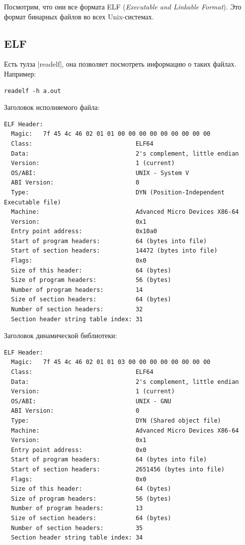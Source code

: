 \documentclass[11pt]{article}
\begin{document}
Посмотрим, что они все формата ELF (\textit{Executable and Linkable Format}).
Это формат бинарных файлов во всех Unix-системах.

\subsection{ELF}

Есть тулза \nolint|readelf|, она позволяет посмотреть информацию о таких
файлах. Например:

\begin{lstlisting}
readelf -h a.out
\end{lstlisting}
Заголовок исполняемого файла:

\begin{lstlisting}
ELF Header:
  Magic:   7f 45 4c 46 02 01 01 00 00 00 00 00 00 00 00 00
  Class:                             ELF64
  Data:                              2's complement, little endian
  Version:                           1 (current)
  OS/ABI:                            UNIX - System V
  ABI Version:                       0
  Type:                              DYN (Position-Independent Executable file)
  Machine:                           Advanced Micro Devices X86-64
  Version:                           0x1
  Entry point address:               0x10a0
  Start of program headers:          64 (bytes into file)
  Start of section headers:          14472 (bytes into file)
  Flags:                             0x0
  Size of this header:               64 (bytes)
  Size of program headers:           56 (bytes)
  Number of program headers:         14
  Size of section headers:           64 (bytes)
  Number of section headers:         32
  Section header string table index: 31
\end{lstlisting}
\newpage

Заголовок динамической библиотеки:

\begin{lstlisting}
ELF Header:
  Magic:   7f 45 4c 46 02 01 01 03 00 00 00 00 00 00 00 00
  Class:                             ELF64
  Data:                              2's complement, little endian
  Version:                           1 (current)
  OS/ABI:                            UNIX - GNU
  ABI Version:                       0
  Type:                              DYN (Shared object file)
  Machine:                           Advanced Micro Devices X86-64
  Version:                           0x1
  Entry point address:               0x0
  Start of program headers:          64 (bytes into file)
  Start of section headers:          2651456 (bytes into file)
  Flags:                             0x0
  Size of this header:               64 (bytes)
  Size of program headers:           56 (bytes)
  Number of program headers:         13
  Size of section headers:           64 (bytes)
  Number of section headers:         35
  Section header string table index: 34
\end{lstlisting}
\end{document}
